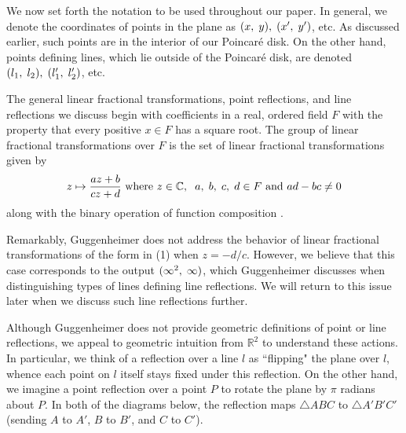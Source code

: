 \documentclass[12pt]{article}
\newcommand{\R}{\mathbb{R}}
\newcommand{\C}{\mathbb{C}}
\newcommand{\ttc}{, \hspace{1mm}}
\newcommand{\poincare}{Poincar\'{e} }
\newcommand{\specialend}{(\infty^2\ttc\infty)}
\theoremstyle{plain}
\theoremstyle{definition}
\begin{document}
\hspace{10mm} We now set forth the notation to be used throughout our paper. In general, we denote the coordinates of points in the plane as $(x \ttc y) \ttc (x' \ttc y')$, etc. As discussed earlier, such points are in the interior of our \poincare disk. On the other hand, points defining lines, which lie outside of the \poincare disk, are denoted $(l_1 \ttc l_2) \ttc (l_1' \ttc l_2')$, etc. 

The general linear fractional transformations, point reflections, and line reflections we discuss begin with coefficients in a real, ordered field $F$ with the property that every positive $x \in F$ has a square root. The group of linear fractional transformations over $F$ is the set of linear fractional transformations given by
\begin{equation} 
	z \mapsto \frac{az+b}{cz+d} \text{ where } z \in \C, \hspace{2mm} a \ttc b \ttc c \ttc d \in F \text{ and } ad-bc \neq 0 
\end{equation}
along with the binary operation of function composition \cite{shuman_lfts}.

Remarkably, Guggenheimer does not address the behavior of linear fractional transformations of the form in (1) when $z = -d/c$. However, we believe that this case corresponds to the output $\specialend$, which Guggenheimer discusses when distinguishing types of lines defining line reflections. We will return to this issue later when we discuss such line reflections further. 

Although Guggenheimer does not provide geometric definitions of point or line reflections, we appeal to geometric intuition from $\R^2$ to understand these actions. In particular, we think of a reflection over a line $l$ as ``flipping" the plane over $l$, whence each point on $l$ itself stays fixed under this reflection. On the other hand, we imagine a point reflection over a point $P$ to rotate the plane by $\pi$ radians about $P$. In both of the diagrams below, the reflection maps $\triangle ABC$ to $\triangle A'B'C'$ (sending $A$ to $A'$, $B$ to $B'$, and $C$ to $C'$). 
\end{document}
